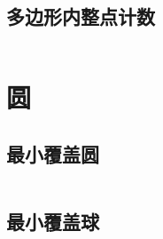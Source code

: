 \documentclass[a4paper,openany]{book}
\newcommand{\cppcode}[1]{
    \inputminted[mathescape,
    			 tabsize=4,
    			 linenos,
    			 frame=single,
    			 framesep=2mm,
    			 breakaftergroup=true,
    			 breakautoindent=true,
    			 breakbytoken=true,
    			 breaklines=true
    ]{cpp}{#1}
}
\begin{document}
\begin{spacing}{1.0}
			\subsection{多边形内整点计数}
				\cppcode{Source/Computational-Geometry/Lattice-In-Polygon-Counter.cpp}
		\section{圆}
			\subsection{最小覆盖圆}
				\cppcode{Source/Computational-Geometry/Minimum-Coverage-Circle.cpp}
			\subsection{最小覆盖球}
				\cppcode{Source/Computational-Geometry/Minimum-Coverage-Ball.cpp}

\end{spacing}
\end{document}
